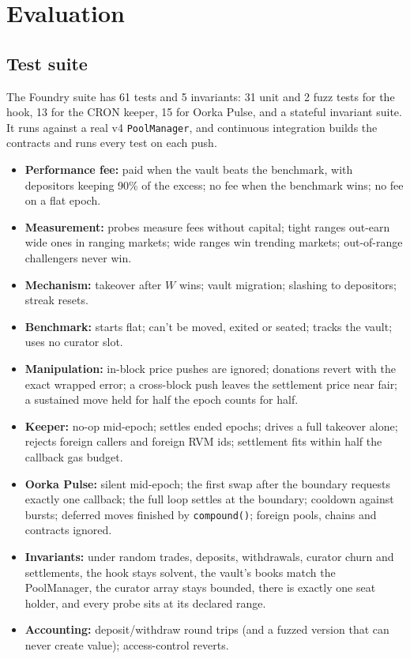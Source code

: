 \documentclass[11pt,a4paper]{article}
\newcommand{\code}[1]{\texttt{\small #1}}
\begin{document}
\section{Evaluation}\label{sec:eval}
\subsection{Test suite}
The Foundry suite has 61 tests and 5 invariants: 31 unit and 2 fuzz tests for the hook, 13 for the CRON keeper, 15 for Oorka Pulse, and a stateful invariant suite. It runs against a real v4 \code{PoolManager}, and continuous integration builds the contracts and runs every test on each push.
\begin{itemize}
  \item \textbf{Performance fee:} paid when the vault beats the benchmark, with depositors keeping 90\% of the excess; no fee when the benchmark wins; no fee on a flat epoch.
  \item \textbf{Measurement:} probes measure fees without capital; tight ranges out-earn wide ones in ranging markets; wide ranges win trending markets; out-of-range challengers never win.
  \item \textbf{Mechanism:} takeover after $W$ wins; vault migration; slashing to depositors; streak resets.
  \item \textbf{Benchmark:} starts flat; can't be moved, exited or seated; tracks the vault; uses no curator slot.
  \item \textbf{Manipulation:} in-block price pushes are ignored; donations revert with the exact wrapped error; a cross-block push leaves the settlement price near fair; a sustained move held for half the epoch counts for half.
  \item \textbf{Keeper:} no-op mid-epoch; settles ended epochs; drives a full takeover alone; rejects foreign callers and foreign RVM ids; settlement fits within half the callback gas budget.
  \item \textbf{Oorka Pulse:} silent mid-epoch; the first swap after the boundary requests exactly one callback; the full loop settles at the boundary; cooldown against bursts; deferred moves finished by \code{compound()}; foreign pools, chains and contracts ignored.
  \item \textbf{Invariants:} under random trades, deposits, withdrawals, curator churn and settlements, the hook stays solvent, the vault's books match the PoolManager, the curator array stays bounded, there is exactly one seat holder, and every probe sits at its declared range.
  \item \textbf{Accounting:} deposit/withdraw round trips (and a fuzzed version that can never create value); access-control reverts.
\end{itemize}
\end{document}

